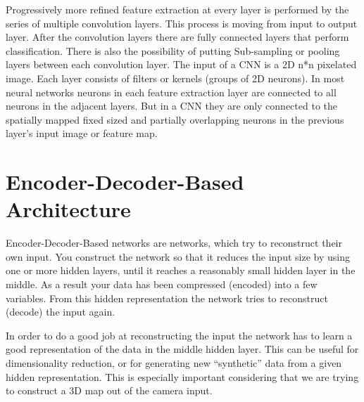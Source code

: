 Progressively more refined feature extraction at every layer is performed by the series of multiple convolution layers. This process is moving from input to output layer. After the convolution layers there are fully connected layers that perform classification. There is also the possibility of putting Sub-sampling or pooling layers between each convolution layer. The input of a CNN is a 2D n*n pixelated image. Each layer consists of filters or kernels (groups of 2D neurons). In most neural networks neurons in each feature extraction layer are connected to all neurons in the adjacent layers. But in a CNN they are only connected to the spatially mapped fixed sized and partially overlapping neurons in the previous layer’s input image or feature map.

\section{Encoder-Decoder-Based Architecture}

Encoder-Decoder-Based networks are networks, which try to reconstruct their own input. You construct the network so that it reduces the input size by using one or more hidden layers, until it reaches a reasonably small hidden layer in the middle. As a result your data has been compressed (encoded) into a few variables. From this hidden representation the network tries to reconstruct (decode) the input again.

In order to do a good job at reconstructing the input the network has to learn a good representation of the data in the middle hidden layer. This can be useful for dimensionality reduction, or for generating new “synthetic” data from a given hidden representation. This is especially important considering that we are trying to construct a 3D map out of the camera input. 









